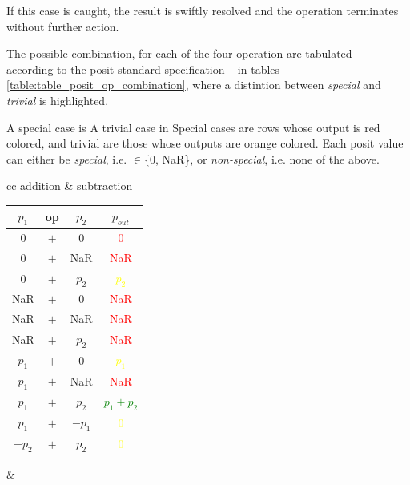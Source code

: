 If this case is caught, the result is swiftly resolved and the operation terminates without further action.


The possible combination, for each of the four operation are tabulated -- according to the posit standard specification -- in tables \ref{table:table_posit_op_combination}, where a distintion between \textit{special} and \textit{trivial} is highlighted.



A special case is A trivial case in
Special cases are rows whose output is red colored, and trivial are those whose outputs are orange colored.
Each posit value can either be \textit{special}, i.e. $\in \{0$, \mbox{NaR}\}, or \textit{non-special}, i.e. none of the above.

\begin{table}
\begin{center}
\begin{tabular}{ cc }   %
addition & subtraction \\
\begin{tabular}{||c c c | c||}
    \hline
    $p_1$ & op & $p_2$ & $p_{out}$ \\ [0.5ex]
    \hline\hline
    $0$ & $+$ & $0$ & \textcolor{red}{$0$} \\
    \hline
    $0$ & $+$ & NaR & \textcolor{red}{NaR} \\
    \hline
    $0$ & $+$ & $p_2$ & \textcolor{yellow}{$p_2$} \\ %
    \hline
    NaR & $+$ & $0$ & \textcolor{red}{NaR} \\
    \hline
    NaR & $+$ & NaR & \textcolor{red}{NaR} \\
    \hline
    NaR & $+$ & $p_2$ & \textcolor{red}{NaR} \\
    \hline
    $p_1$ & $+$ & $0$ & \textcolor{yellow}{$p_1$} \\
    \hline
    $p_1$ & $+$ & NaR & \textcolor{red}{NaR} \\
    \hline
    $p_1$ & $+$ & $p_2$ & \textcolor{green}{$p_1 + p_2$} \\
    \hline %
    $p_1$ & $+$ & $-p_1$ & \textcolor{yellow}{$0$} \\
    \hline
    $-p_2$ & $+$ & $p_2$ & \textcolor{yellow}{$0$} \\
    \hline
\end{tabular} &
\begin{tabular}{||c c c | c||}
    \hline

\end{tabular}
\end{tabular}
\end{center}
\end{table}
